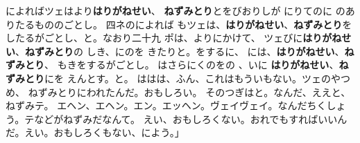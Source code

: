 \documentclass[
    a4paper,
    10pt,
    book]
    {tarticle}
\begin{document}
\newpage
\thispagestyle{fancy}
によればツェはより\textbf{はりがねせい}、
\textbf{ねずみとり}とをびおりしが
にりてのに
のありたるもののごとし。
四ネのによれば
もツェは、\textbf{はりがねせい}、\textbf{ねずみとり}を
したるがごとし、と。なおり二十九
ポは、よりにかけて、
ツェびに\textbf{はりがねせい}、\textbf{ねずみとり}の
しき、にのを
きたりと。をするに、
には、\textbf{はりがねせい}、\textbf{ねずみとり}、
もきをするがごとし。
はさらにくのをの
、いに
\textbf{はりがねせい}、\textbf{ねずみとり}にを
えんとす。と。
ははは、ふん、これはもういもない。ツェのやつめ、
ねずみとりにわれたんだ。おもしろい。
そのつぎはと。なんだ、ええと、ねずみテ。
エヘン、エヘン。エン。エッヘン。ヴェイヴェイ。なんだちくしょう。テなどがねずみだなんて。
えい、おもしろくない。おれでもすればいいんだ。えい。おもしろくもない、によう。」
\begin{comment}
\end{comment}
\end{document}
